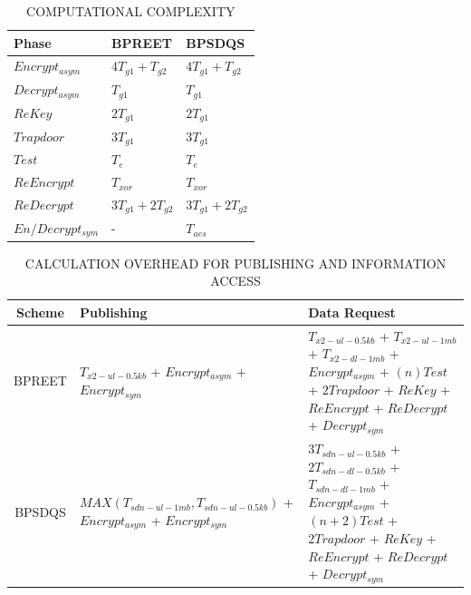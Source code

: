 \documentclass[journal]{IEEEtran}
\begin{document}
\begin{table}[t!]
\centering 
\caption{COMPUTATIONAL COMPLEXITY}
\begin{tabular}{|p{2cm}|p{2cm}|p{2cm}|}
\hline
    Phase & BPREET & BPSDQS \\
\hline
    $Encrypt_{asym}$ & $4T_{g1}+T_{g2}$ & $4T_{g1}+T_{g2}$ \\
\hline
    $Decrypt_{asym}$ & $T_{g1}$ & $T_{g1}$ \\
\hline
    $ReKey$ & $2T_{g1}$ & $2T_{g1}$ \\
\hline
    $Trapdoor$ & $3T_{g1}$ & $3T_{g1}$ \\
\hline
    $Test$ & $T_{e}$ & $T_{e}$ \\
\hline
    $ReEncrypt$ & $T_{xor}$ & $T_{xor}$ \\
\hline
    $ReDecrypt$ & $3T_{g1}+2T_{g2}$ & $3T_{g1}+2T_{g2}$ \\
\hline
    $En/Decrypt_{sym}$ & - & $T_{aes}$ \\
\hline
\end{tabular}
\label{tab:complexity}
\end{table}

\begin{table}[t!]
\centering 
\caption{CALCULATION OVERHEAD FOR PUBLISHING AND INFORMATION ACCESS }
\begin{tabular}{|c|p{7cm}|p{9cm}|}
\hline
    Scheme & Publishing & Data Request \\
\hline
    BPREET \cite{BPREET} & $T_{x2-ul-0.5kb}$ + $Encrypt_{asym}$ + $Encrypt_{sym}$ & $T_{x2-ul-0.5kb}$ + $T_{x2-ul-1mb}$ + $T_{x2-dl-1mb}$ + $Encrypt_{asym}$ + $(n)Test$ + $2Trapdoor$ + $ReKey$ + $ReEncrypt$ + $ReDecrypt$ + $Decrypt_{sym}$  \\
\hline
    BPSDQS & $MAX(T_{sdn-ul-1mb}, T_{sdn-ul-0.5kb})$ + $Encrypt_{asym}$ + $Encrypt_{sym}$ & $3T_{sdn-ul-0.5kb}$ + $2T_{sdn-dl-0.5kb}$ + $T_{sdn-dl-1mb}$ + $Encrypt_{asym}$ + $(n+2)Test$ + $2Trapdoor$ + $ReKey$ + $ReEncrypt$ + $ReDecrypt$ + $Decrypt_{sym}$  \\
\hline
\end{tabular}
\label{tab:request_overhead}
\end{table}
\end{document}
